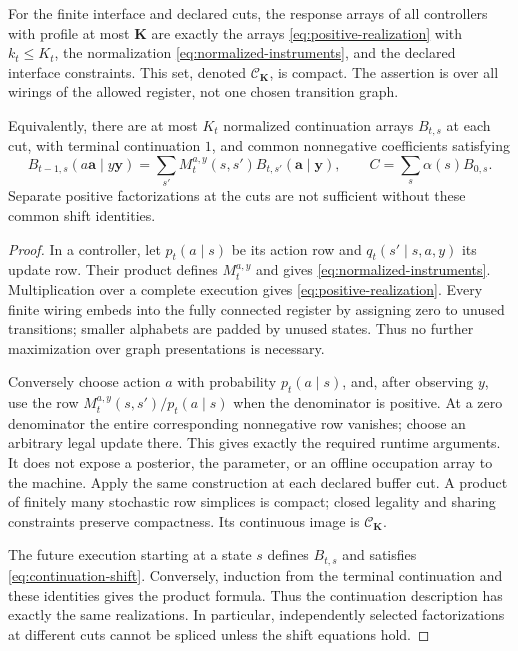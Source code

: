\begin{proposition}
\label{prop:outer-normal-form}
For the finite interface and declared cuts, the response arrays of all
controllers with profile at most $\mathbf K$ are exactly the arrays
\eqref{eq:positive-realization} with $k_t\le K_t$, the normalization
\eqref{eq:normalized-instruments}, and the declared interface constraints.
This set, denoted $\mathcal C_{\mathbf K}$, is compact. The assertion is
over all wirings of the allowed register, not one chosen transition graph.

Equivalently, there are at most $K_t$ normalized continuation arrays
$B_{t,s}$ at each cut, with terminal continuation $1$, and common
nonnegative coefficients satisfying
\begin{equation}\label{eq:continuation-shift}
 B_{t-1,s}(a\mathbf a\mid y\mathbf y)
   =\sum_{s'}M_t^{a,y}(s,s')B_{t,s'}(\mathbf a\mid\mathbf y),
 \qquad C=\sum_s\alpha(s)B_{0,s}.
\end{equation}
Separate positive factorizations at the cuts are not sufficient without
these common shift identities.
\end{proposition}
\begin{proof}
In a controller, let $p_t(a\mid s)$ be its action row and
$q_t(s'\mid s,a,y)$ its update row. Their product defines $M_t^{a,y}$
and gives \eqref{eq:normalized-instruments}. Multiplication over a
complete execution gives \eqref{eq:positive-realization}. Every finite
wiring embeds into the fully connected register by assigning zero to
unused transitions; smaller alphabets are padded by unused states.
Thus no further maximization over graph presentations is necessary.

Conversely choose action $a$ with probability $p_t(a\mid s)$, and,
after observing $y$, use the row
$M_t^{a,y}(s,s')/p_t(a\mid s)$ when the denominator is positive.
At a zero denominator the entire corresponding nonnegative row vanishes;
choose an arbitrary legal update there. This gives exactly the required
runtime arguments. It does not expose a posterior, the parameter, or an
offline occupation array to the machine. Apply the same construction at
each declared buffer cut. A product of finitely many stochastic row
simplices is compact; closed legality and sharing constraints preserve
compactness. Its continuous image is $\mathcal C_{\mathbf K}$.

The future execution starting at a state $s$ defines $B_{t,s}$ and
satisfies \eqref{eq:continuation-shift}. Conversely, induction from the
terminal continuation and these identities gives the product formula.
Thus the continuation description has exactly the same realizations.
In particular, independently selected factorizations at different cuts
cannot be spliced unless the shift equations hold.
\end{proof}


